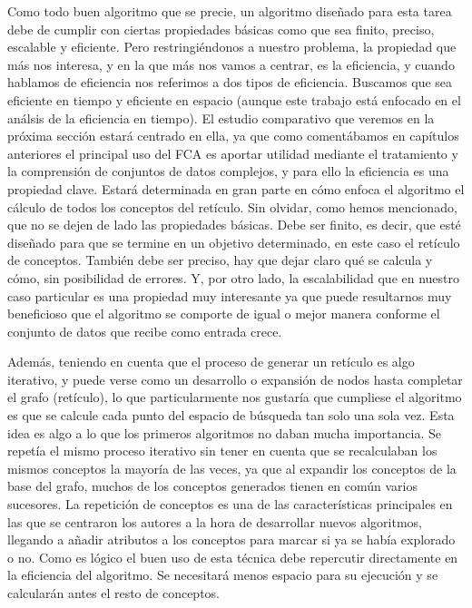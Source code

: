 \documentclass[oneside,openright,titlepage,numbers=noenddot,openany,headinclude,footinclude=true,
cleardoublepage=empty,abstractoff,BCOR=5mm,paper=a4,fontsize=12pt,main=spanish]{scrreprt}
\begin{document}
Como todo buen algoritmo que se precie, un algoritmo diseñado para esta tarea debe de cumplir con ciertas propiedades básicas como que sea finito, preciso, escalable y eficiente. Pero restringiéndonos a nuestro problema, la propiedad que más nos interesa, y en la que más nos vamos a centrar, es la eficiencia, y cuando hablamos de eficiencia nos referimos a dos tipos de eficiencia. Buscamos que sea eficiente en tiempo y eficiente en espacio (aunque este trabajo está enfocado en el análsis de la eficiencia en tiempo). El estudio comparativo que veremos en la próxima sección estará centrado en ella, ya que como comentábamos en capítulos anteriores el principal uso del FCA es aportar utilidad mediante el tratamiento y la comprensión de conjuntos de datos complejos, y para ello la eficiencia es una propiedad clave. Estará determinada en gran parte en cómo enfoca el algoritmo el cálculo de todos los conceptos del retículo. Sin olvidar, como hemos mencionado, que no se dejen de lado las propiedades básicas. Debe ser finito, es decir, que esté diseñado para que se termine en un objetivo determinado, en este caso el retículo de conceptos. También debe ser preciso, hay que dejar claro qué se calcula y cómo, sin posibilidad de errores. Y, por otro lado, la escalabilidad que en nuestro caso particular es una propiedad muy interesante ya que puede resultarnos muy beneficioso que el algoritmo se comporte de igual o mejor manera conforme el conjunto de datos que recibe como entrada crece. 

Además, teniendo en cuenta que el proceso de generar un retículo es algo iterativo, y puede verse como un desarrollo o expansión de nodos hasta completar el grafo (retículo), lo que particularmente nos gustaría que cumpliese el algoritmo es que se calcule cada punto del espacio de búsqueda tan solo una sola vez. Esta idea es algo  a lo que los primeros algoritmos no daban mucha importancia. Se repetía el mismo proceso iterativo sin tener en cuenta que se recalculaban los mismos conceptos la mayoría de las veces, ya que al expandir los conceptos de la base del grafo, muchos de los conceptos generados tienen en común varios sucesores. La repetición de conceptos es una de las características principales en las que se centraron los autores a la hora de desarrollar nuevos algoritmos, llegando a añadir atributos a los conceptos para marcar si ya se había explorado o no. Como es lógico el buen uso de esta técnica debe repercutir directamente en la eficiencia del algoritmo. Se necesitará menos espacio para su ejecución y se calcularán antes el resto de conceptos. 
\end{document}
